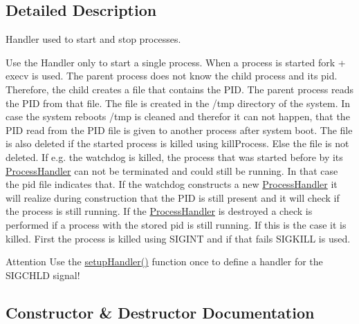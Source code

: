 \subsection{Detailed Description}
Handler used to start and stop processes. 

Use the Handler only to start a single process. When a process is started fork + execv is used. The parent process does not know the child process and its pid. Therefore, the child creates a file that contains the P\+ID. The parent process reads the P\+ID from that file. The file is created in the /tmp directory of the system. In case the system reboots /tmp is cleaned and therefor it can not happen, that the P\+ID read from the P\+ID file is given to another process after system boot. The file is also deleted if the started process is killed using kill\+Process. Else the file is not deleted. If e.\+g. the watchdog is killed, the process that was started before by its \hyperlink{structProcessHandler}{Process\+Handler} can not be terminated and could still be running. In that case the pid file indicates that. If the watchdog constructs a new \hyperlink{structProcessHandler}{Process\+Handler} it will realize during construction that the P\+ID is still present and it will check if the process is still running. If the \hyperlink{structProcessHandler}{Process\+Handler} is destroyed a check is performed if a process with the stored pid is still running. If this is the case it is killed. First the process is killed using S\+I\+G\+I\+NT and if that fails S\+I\+G\+K\+I\+LL is used.

\begin{DoxyAttention}{Attention}
Use the \hyperlink{structProcessHandler_a4eb6afb25ee59bf5e015c465b71c40c2}{setup\+Handler()} function once to define a handler for the S\+I\+G\+C\+H\+LD signal! 
\end{DoxyAttention}


\subsection{Constructor \& Destructor Documentation}
